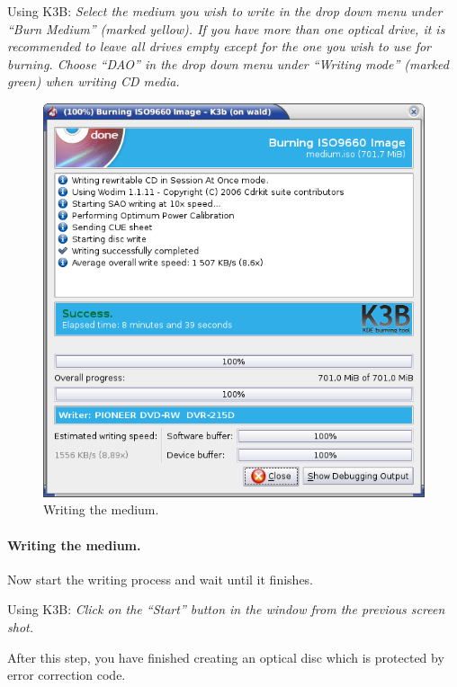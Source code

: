 \bigskip

Using K3B: {\em Select the medium you wish to write in the drop
  down menu under ``Burn Medium'' (marked yellow). If you have
  more than one optical drive, it is recommended to leave all
  drives empty except for the one you wish to use for burning.
  Choose ``DAO'' in the drop down menu under ``Writing mode''
  (marked green) when writing CD media. }

\newpage
\begin{figure}[h]
\centerline{\includegraphics[width=\textwidth]{screenshots/write-iso4.png}}
\caption{Writing the medium.}  
\label{howto-augment-write-iso-medium}
\end{figure}

\paragraph{Writing the medium.} Now start the writing process
and wait until it finishes.

\bigskip

Using K3B: {\em Click on the ``Start'' button in the window
  from the previous screen shot. }

\bigskip

After this step, you have finished creating an optical disc
which is protected by error correction code.

